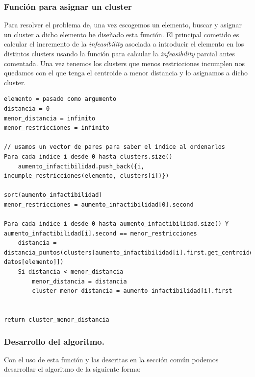 \documentclass[12pt, spanish]{article}
\begin{document}
\subsubsection{Función para asignar un cluster}

Para resolver el problema de, una vez escogemos un elemento, buscar y asignar un cluster a dicho elemento he diseñado esta función. El principal cometido es calcular el incremento de la \textit{infeasibility} asociada a introducir el elemento en los distintos clusters usando la función para calcular la \textit{infeasibility} parcial antes comentada. Una vez tenemos los clusters que menos restricciones incumplen nos quedamos con el que tenga el centroide a menor distancia y lo asignamos a dicho cluster.


\begin{lstlisting}
elemento = pasado como argumento
distancia = 0
menor_distancia = infinito
menor_restricciones = infinito

// usamos un vector de pares para saber el indice al ordenarlos
Para cada indice i desde 0 hasta clusters.size()
	aumento_infactibilidad.push_back({i, incumple_restricciones(elemento, clusters[i])})

sort(aumento_infactibilidad)
menor_restricciones = aumento_infactibilidad[0].second

Para cada indice i desde 0 hasta aumento_infactibilidad.size() Y aumento_infactibilidad[i].second == menor_restricciones
	distancia = distancia_puntos(clusters[aumento_infactibilidad[i].first.get_centroide(), datos[elemento]])
	Si distancia < menor_distancia
		menor_distancia = distancia
		cluster_menor_distancia = aumento_infactibilidad[i].first


return cluster_menor_distancia
\end{lstlisting}


\subsubsection{Desarrollo del algoritmo.}

Con el uso de esta función y las descritas en la sección común podemos desarrollar el algoritmo de la siguiente forma:
\end{document}
